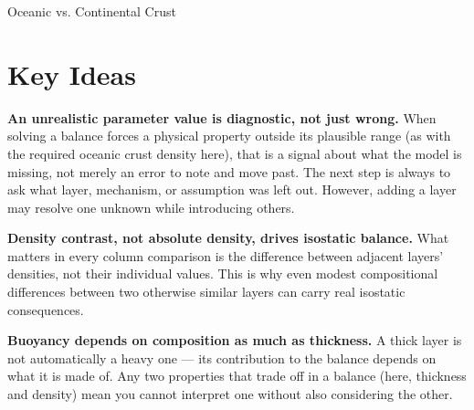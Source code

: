 \begin{activity}{Oceanic vs. Continental Crust}
\section*{Key Ideas}

\textbf{An unrealistic parameter value is diagnostic, not just wrong.} When solving a balance forces a physical property outside its plausible range (as with the required oceanic crust density here), that is a signal about what the model is missing, not merely an error to note and move past. The next step is always to ask what layer, mechanism, or assumption was left out. However, adding a layer may resolve one unknown while introducing others.

\textbf{Density contrast, not absolute density, drives isostatic balance.} What matters in every column comparison is the difference between adjacent layers' densities, not their individual values. This is why even modest compositional differences between two otherwise similar layers can carry real isostatic consequences.

\textbf{Buoyancy depends on composition as much as thickness.} A thick layer is not automatically a heavy one --- its contribution to the balance depends on what it is made of. Any two properties that trade off in a balance (here, thickness and density) mean you cannot interpret one without also considering the other.

\end{activity}